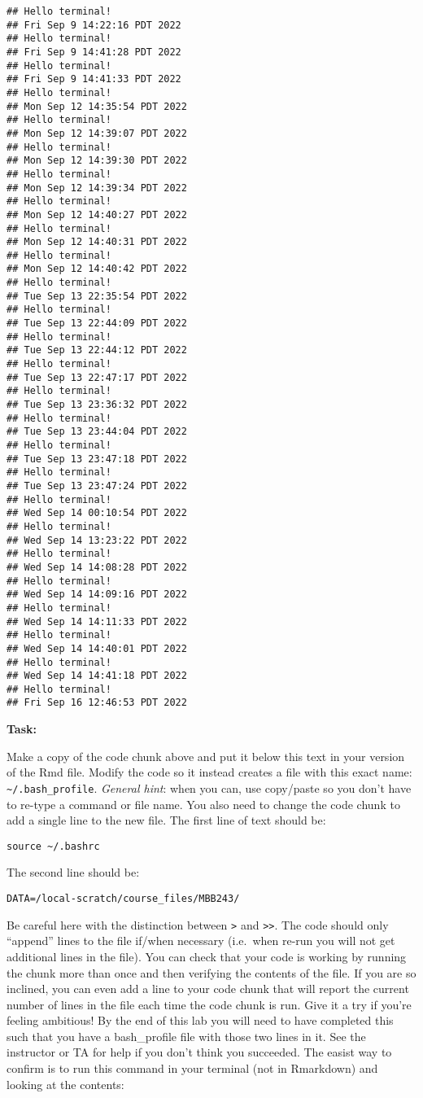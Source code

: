 \documentclass[
]{article}
\begin{document}
\begin{verbatim}
## Hello terminal!
## Fri Sep 9 14:22:16 PDT 2022
## Hello terminal!
## Fri Sep 9 14:41:28 PDT 2022
## Hello terminal!
## Fri Sep 9 14:41:33 PDT 2022
## Hello terminal!
## Mon Sep 12 14:35:54 PDT 2022
## Hello terminal!
## Mon Sep 12 14:39:07 PDT 2022
## Hello terminal!
## Mon Sep 12 14:39:30 PDT 2022
## Hello terminal!
## Mon Sep 12 14:39:34 PDT 2022
## Hello terminal!
## Mon Sep 12 14:40:27 PDT 2022
## Hello terminal!
## Mon Sep 12 14:40:31 PDT 2022
## Hello terminal!
## Mon Sep 12 14:40:42 PDT 2022
## Hello terminal!
## Tue Sep 13 22:35:54 PDT 2022
## Hello terminal!
## Tue Sep 13 22:44:09 PDT 2022
## Hello terminal!
## Tue Sep 13 22:44:12 PDT 2022
## Hello terminal!
## Tue Sep 13 22:47:17 PDT 2022
## Hello terminal!
## Tue Sep 13 23:36:32 PDT 2022
## Hello terminal!
## Tue Sep 13 23:44:04 PDT 2022
## Hello terminal!
## Tue Sep 13 23:47:18 PDT 2022
## Hello terminal!
## Tue Sep 13 23:47:24 PDT 2022
## Hello terminal!
## Wed Sep 14 00:10:54 PDT 2022
## Hello terminal!
## Wed Sep 14 13:23:22 PDT 2022
## Hello terminal!
## Wed Sep 14 14:08:28 PDT 2022
## Hello terminal!
## Wed Sep 14 14:09:16 PDT 2022
## Hello terminal!
## Wed Sep 14 14:11:33 PDT 2022
## Hello terminal!
## Wed Sep 14 14:40:01 PDT 2022
## Hello terminal!
## Wed Sep 14 14:41:18 PDT 2022
## Hello terminal!
## Fri Sep 16 12:46:53 PDT 2022
\end{verbatim}

\textbf{Task:}

Make a copy of the code chunk above and put it below this text in your
version of the Rmd file. Modify the code so it instead creates a file
with this exact name: \texttt{\textasciitilde{}/.bash\_profile}.
\emph{General hint}: when you can, use copy/paste so you don't have to
re-type a command or file name. You also need to change the code chunk
to add a single line to the new file. The first line of text should be:

\texttt{source\ \textasciitilde{}/.bashrc}

The second line should be:

\texttt{DATA=/local-scratch/course\_files/MBB243/}

Be careful here with the distinction between \texttt{\textgreater{}} and
\texttt{\textgreater{}\textgreater{}}. The code should only ``append''
lines to the file if/when necessary (i.e.~when re-run you will not get
additional lines in the file). You can check that your code is working
by running the chunk more than once and then verifying the contents of
the file. If you are so inclined, you can even add a line to your code
chunk that will report the current number of lines in the file each time
the code chunk is run. Give it a try if you're feeling ambitious! By the
end of this lab you will need to have completed this such that you have
a bash\_profile file with those two lines in it. See the instructor or
TA for help if you don't think you succeeded. The easist way to confirm
is to run this command in your terminal (not in Rmarkdown) and looking
at the contents:
\end{document}
